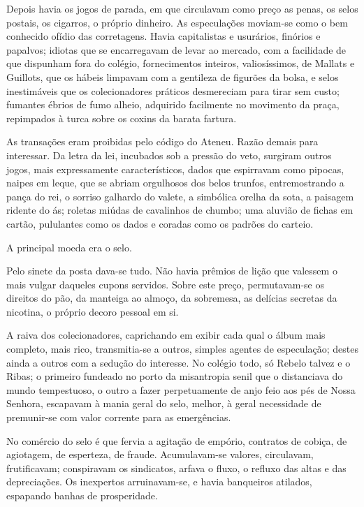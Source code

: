 Depois havia os jogos de parada, em que circulavam como preço as penas, os
selos postais, os cigarros, o próprio dinheiro. As especulações
moviam{}-se como o bem conhecido ofídio das corretagens. Havia
capitalistas e usurários, finórios e papalvos; idiotas que se
encarregavam de levar ao mercado, com a facilidade de que dispunham
fora do colégio, fornecimentos inteiros, valiosíssimos, de Mallats e
Guillots, que os hábeis limpavam com a gentileza de figurões da bolsa,
e selos inestimáveis que os colecionadores práticos desmereciam para
tirar sem custo; fumantes ébrios de fumo alheio, adquirido facilmente
no movimento da praça, repimpados à turca sobre os coxins da barata
fartura. 

As transações eram proibidas pelo código do Ateneu. Razão
demais para interessar. Da letra da lei, incubados sob a pressão do
veto, surgiram outros jogos, mais expressamente característicos, dados
que espirravam como pipocas, naipes em leque, que se abriam orgulhosos
dos belos trunfos, entremostrando a pança do rei, o sorriso galhardo do
valete, a simbólica orelha da sota, a paisagem ridente do ás; roletas
miúdas de cavalinhos de chumbo; uma aluvião de fichas em cartão,
pululantes como os dados e coradas como os padrões do carteio. 

A principal moeda era o selo. 

Pelo sinete da posta dava{}-se tudo. Não
havia prêmios de lição que valessem o mais vulgar daqueles cupons
servidos. Sobre este preço, permutavam{}-se os direitos do pão, da
manteiga ao almoço, da sobremesa, as delícias secretas da nicotina, o
próprio decoro pessoal em si. 

A raiva dos colecionadores, caprichando
em exibir cada qual o álbum mais completo, mais rico, transmitia{}-se a
outros, simples agentes de especulação; destes ainda a outros com a
sedução do interesse. No colégio todo, só Rebelo talvez e o Ribas; o
primeiro fundeado no porto da misantropia senil que o distanciava do
mundo tempestuoso, o outro a fazer perpetuamente de anjo feio aos pés
de Nossa Senhora, escapavam à mania geral do selo, melhor, à geral
necessidade de premunir{}-se com valor corrente para as emergências. 

No comércio do selo é que fervia a agitação de empório, contratos de
cobiça, de agiotagem, de esperteza, de fraude. Acumulavam{}-se valores,
circulavam, frutificavam; conspiravam os sindicatos, arfava o fluxo, o
refluxo das altas e das depreciações. Os inexpertos arruinavam{}-se, e
havia banqueiros atilados, espapando banhas de prosperidade.

